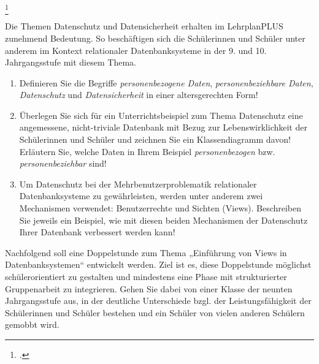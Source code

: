 \documentclass{lehramt-informatik-aufgabe}
\begin{document}
\footcite{examen:66118:2020:03}

Die Themen Datenschutz und Datensicherheit erhalten im LehrplanPLUS
zunehmend Bedeutung. So beschäftigen sich die Schülerinnen und Schüler
unter anderem im Kontext relationaler Datenbanksysteme in der 9. und
10. Jahrgangsstufe mit diesem Thema.

\begin{enumerate}
\item Definieren Sie die Begriffe \emph{personenbezogene Daten},
\emph{personenbeziehbare Daten}, \emph{Datenschutz} und
\emph{Datensicherheit} in einer
altersgerechten Form!

\item Überlegen Sie sich für ein Unterrichtsbeispiel zum Thema
Datenschutz eine angemessene, nicht-triviale Datenbank mit Bezug zur
Lebenswirklichkeit der Schülerinnen und Schüler und zeichnen Sie ein
Klassendiagramm davon! Erläutern Sie, welche Daten in Ihrem Beispiel
\emph{personenbezogen} bzw. \emph{personenbeziehbar} sind!

\item Um Datenschutz bei der Mehrbenutzerproblematik relationaler
Datenbanksysteme zu gewährleisten, werden unter anderem zwei
Mechanismen verwendet: Benutzerrechte und Sichten (Views). Beschreiben
Sie jeweils ein Beispiel, wie mit diesen beiden Mechanismen der
Datenschutz Ihrer Datenbank verbessert werden kann!
\end{enumerate}

\noindent
Nachfolgend soll eine Doppelstunde zum Thema „Einführung von Views in
Datenbanksystemen“ entwickelt werden. Ziel ist es, diese Doppelstunde
möglichst schülerorientiert zu gestalten und mindestens eine Phase mit
strukturierter Gruppenarbeit zu integrieren. Gehen Sie dabei von einer
Klasse der neunten Jahrgangsstufe aus, in der deutliche Unterschiede
bzgl. der Leistungsfähigkeit der Schülerinnen und Schüler bestehen und
ein Schüler von vielen anderen Schülern gemobbt wird.
\end{document}
